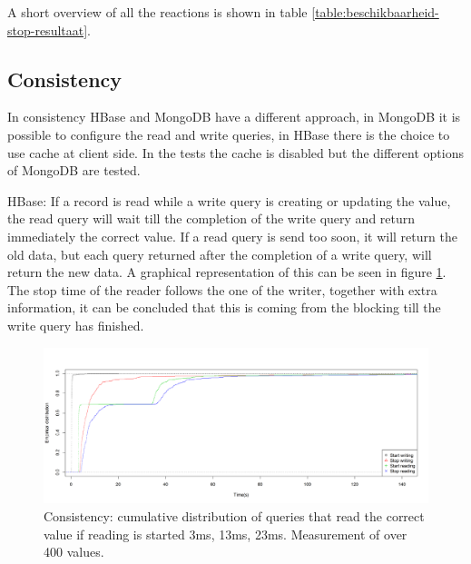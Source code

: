 \documentclass[10pt,conference,letterpaper]{IEEEtran}
\begin{document}
A short overview of all the reactions is shown in table \ref{table:beschikbaarheid-stop-resultaat}. 
\begin{table}[htbp]
  \centering
    \caption{Availability: Overview of different reaction when stopping an instance }
  \label{table:beschikbaarheid-stop-resultaat}%
\end{table}

\subsection{Consistency}
In consistency HBase and MongoDB have a different approach, in MongoDB it is possible to configure the read and write queries, in HBase there is the choice to use cache at client side. In the tests the cache is disabled but the different options of MongoDB are tested. 

HBase: If a record is read while a write query is creating or updating the value, the read query will wait till the completion of the write query and return immediately the correct value. If a read query is send too soon, it will return the old data, but each query returned after the completion of a write query, will return the new data. A graphical representation of this can be seen in figure \ref{fig:consistentie-hbase-voorbeeld}. The stop time of the reader follows the one of the writer, together with extra information, it can be concluded that this is coming from the blocking till the write query has finished. 

\begin{figure}[h]
\centering
\includegraphics[width=\linewidth]{img/HBase/ECDF-plot-R-1-insertRawData-5}
\caption{Consistency: cumulative distribution of queries that read the correct value if reading is started 3ms, 13ms, 23ms. Measurement of over 400 values.}
\label{fig:consistentie-hbase-voorbeeld}
\end{figure}
\end{document}
